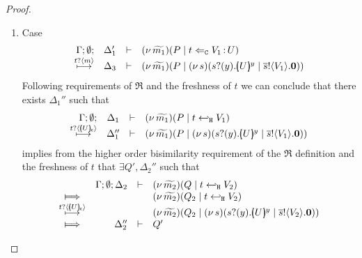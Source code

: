 \begin{proof}
\begin{enumerate}
\begin{enumerate}
							in the cases where $\ell_1 = \news{\widetilde{m}} \bactout{n}{V_1'}$ (resp., $\ell_2 = \news{\widetilde{m}'} \bactout{n}{V_2'}$)
							and $C_1 = C_2 = \inact$ otherwise.
							From \eqref{proof:trig_equiv00} we can conclude that $\exists \Delta_4$ such that
						\[
							\horel{\Gamma}{\Delta_2'}{\newsp{\widetilde{m_1}}{Q \Par \ftrigger{t}{V_2}{U}}}
							{\Hby{\ell_2}}
							{\Delta_4}{\newsp{\widetilde{m_2}'}{Q' \Par \ftrigger{t}{V_2}{U}}}
						\]
							Equation \eqref{proof:trig_equiv11} then concludes that
						\[
							\horel{\Gamma}{\Delta_3'}{\newsp{\widetilde{m_1}'''}{P' \Par \ftrigger{t}{V_1}{U} \Par C_1}}
							{\ \Re\ }
							{\Delta_4'}{\newsp{\widetilde{m_2}'''}{Q' \Par \ftrigger{t}{V_2}{U} \Par C_2}}
						\]
							as required.

					\item	Case
						\[
							\begin{array}{rcll} \Gamma; \emptyset; &\Delta_1'& \vdash& (\nu\, \widetilde{m_1})(P \;|\; t \Leftarrow_{\mathtt{C}} V_1{\,:\,}U)\\ \stackrel{t ? \langle m \rangle}{\longmapsto} &\Delta_3& \vdash &  (\nu\, \widetilde{m_1})(P \;|\; (\nu\, s)(s ? (y) . [\!\!(U)\!\!]^{y} \;|\; \overline{s} ! \langle V_1 \rangle . \mathbf{0})) \end{array}
						\]
							Following requirements of $\Re$ and the freshness of $t$
							we can conclude that there exists $\Delta_1''$ such that
						\[
							\mhorel{\Gamma}{\Delta_1}{\newsp{\widetilde{m_1}}{P \Par \htrigger{t}{V_1}}}
							{\hby{\bactinp{t}{\omapchar{U}}}}
							{\Delta_1''}{}{\newsp{\widetilde{m_1}}{P \Par \newsp{s}{\binp{s}{y} \mapchar{U}{y} \Par \bout{\dual{s}}{V_1} \inact}}}
						\]
							implies from the higher order bisimilarity requirement of the $\Re$ definition and
							the freshness of $t$ that $\exists Q', \Delta_2''$ such that
							\begin{eqnarray}
								\begin{array}{crll}
									& \Gamma; \es; \Delta_2 & \proves &		
									\newsp{\widetilde{m_2}}{Q \Par \htrigger{t}{V_2}}
									\\
									\Hby{} &&&
									\newsp{\widetilde{m_2}}{Q_2 \Par \htrigger{t}{V_2}}
									\\
									{\hby{\bactinp{t}{\omapchar{U}}}} & & &
									\newsp{\widetilde{m_2}}{Q_2 \Par \newsp{s}{\binp{s}{y} \mapchar{U}{y} \Par \bout{\dual{s}}{V_2} \inact}}
									\\
									\Hby{} & \Delta_2'' & \proves & Q'
								\end{array}

\end{eqnarray}
\end{enumerate}
\end{enumerate}
\end{proof}
